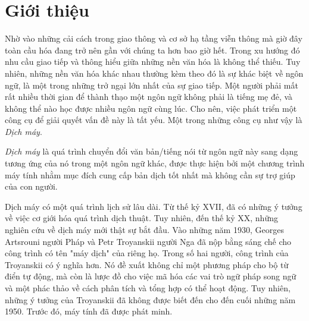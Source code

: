 
\chapter{Giới thiệu }
\ifpdf
    \graphicspath{{Chapter1/Chapter1Figs/PNG/}{Chapter1/Chapter1Figs/PDF/}{Chapter1/Chapter1Figs/}}
\else
    \graphicspath{{Chapter1/Chapter1Figs/EPS/}{Chapter1/Chapter1Figs/}}
\fi

Nhờ vào những cải cách trong giao thông và cơ sở hạ tầng viễn thông mà giờ đây toàn cầu hóa đang trở nên gần với chúng ta hơn bao giờ hết. Trong xu hướng đó nhu cầu giao tiếp và thông hiểu giữa những nền văn hóa là không thể thiếu. Tuy nhiên, những nền văn hóa khác nhau thường kèm theo đó là sự khác biệt về ngôn ngữ, là một trong những trở ngại lớn nhất của sự giao tiếp. Một người phải mất rất nhiều thời gian để thành thạo một ngôn ngữ không phải là tiếng mẹ đẻ, và không thể nào học được nhiều ngôn ngữ cùng lúc. Cho nên, việc phát triển một công cụ để giải quyết vấn đề này là tất yếu. Một trong những công cụ như vậy là \textit{Dịch máy}.

\textit{Dịch máy} là quá trình chuyển đổi văn bản/tiếng nói từ ngôn ngữ này sang dạng tương ứng của nó trong một ngôn ngữ khác, được thực hiện bởi một chương trình máy tính nhằm mục đích cung cấp bản dịch tốt nhất mà không cần sự trợ giúp của con người.

Dịch máy có một quá trình lịch sử lâu dài. Từ thế kỷ XVII, đã có những ý tưởng về việc cơ giới hóa quá trình dịch thuật. Tuy nhiên, đến thế kỷ XX, những nghiên cứu về dịch máy mới thật sự bắt đầu. Vào những năm 1930, Georges Artsrouni người Pháp và Petr Troyanskii người Nga đã nộp bằng sáng chế cho công trình có tên "máy dịch" của riêng họ. Trong số hai người, công trình của Troyanskii có ý nghĩa hơn. Nó đề xuất không chỉ một phương pháp cho bộ từ điển tự động, mà còn là lược đồ cho việc mã hóa các vai trò ngữ pháp song ngữ và một phác thảo về cách phân tích và tổng hợp có thể hoạt động. Tuy nhiên, những ý tưởng của Troyanskii đã không được biết đến cho đến cuối những năm 1950. Trước đó, máy tính đã được phát minh.

